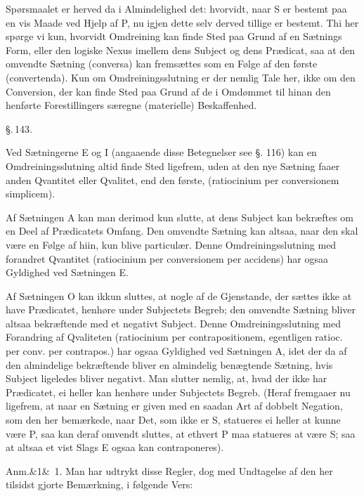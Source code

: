 \documentclass[12pt]{book}
\def\sperr#1{#1}%
\def\textit#1{#1}%
\newcommand{\sperr}[1]{\textls[180]{#1}}
\newcommand{\parag}[1]{%
  \par\vspace{0.9\baselineskip}%
  {\centering\textit{\S.\,#1.}\par}%
  \vspace{0.35\baselineskip}%
  \noindent\hspace{\parindent}\ignorespaces
}
\newcommand{\anm}[1]{%
  \par\vspace{0.5\baselineskip}%
  \noindent\hspace{\parindent}\sperr{Anm.}\ifx&#1&\else~\textit{#1}.\fi
  \enspace\ignorespaces
}
\newcommand{\opage}[1]{\marginnote{\footnotesize\textit{[#1]}}}
\begin{document}
Spørsmaalet er herved da i Almindelighed det: hvorvidt, naar \textit{S} er
bestemt paa en vis Maade ved Hjelp af \textit{P}, nu igjen dette selv derved
tillige er bestemt. Thi her spørge vi kun, hvorvidt Omdreining kan finde Sted
paa Grund af en Sætnings Form, eller den logiske Nexus imellem dens Subject og
dens Prædicat, saa at den omvendte Sætning (\textit{conversa}) kan fremsættes
som en Følge af den første (\textit{convertenda}). Kun om Omdreiningsslutning
er der nemlig Tale her, ikke om den Conversion, der kan finde Sted paa Grund af
de i Omdømmet til hinan%
\opage{332}den henførte Forestillingers særegne (materielle) Beskaffenhed.

\parag{143}

Ved Sætningerne \textit{E} og \textit{I} (angaaende disse Betegnelser see
§. 116) kan en Omdreiningsslutning altid finde Sted ligefrem, uden at den nye
Sætning faaer anden Qvantitet eller Qvalitet, end den første, (\textit{ratiocinium
per conversionem simplicem}).

Af Sætningen \textit{A} kan man derimod kun slutte, at dens Subject kan
bekræftes om en Deel af Prædicatets Omfang. Den omvendte Sætning kan altsaa,
naar den skal være en Følge af hiin, kun blive particulær. Denne
Omdreiningsslutning med forandret Qvantitet (\textit{ratiocinium per
conversionem per accidens}) har ogsaa Gyldighed ved Sætningen \textit{E}.

Af Sætningen \textit{O} kan ikkun sluttes, at nogle af de Gjenstande, der sættes
ikke at have Prædicatet, henhøre under Subjectets Begreb; den omvendte Sætning
bliver altsaa bekræftende med et negativt Subject. Denne Omdreiningsslutning med
Forandring af Qvaliteten (\textit{ratiocinium per contrapositionem, egentligen
ratioc. per conv. per contrapos.}) har ogsaa Gyldighed ved Sætningen \textit{A},
idet der da af den almindelige bekræftende bliver en almindelig benægtende
Sætning, hvis Subject ligeledes bliver negativt. Man slutter nemlig, at, hvad
der ikke har Prædicatet, ei heller kan henhøre under Subjectets Begreb. (Heraf
fremgaaer nu ligefrem,
\opage{333} at naar en Sætning er given med en saadan Art af dobbelt Negation, som den her
bemærkede, naar Det, som ikke er \textit{S}, statueres ei heller at kunne være
\textit{P}, saa kan deraf omvendt sluttes, at ethvert \textit{P} maa statueres
at være \textit{S}; saa at altsaa et vist Slags \textit{E} ogsaa kan
contraponeres).

\anm{1} Man har udtrykt disse Regler, dog med Undtagelse af den her tilsidst
gjorte Bemærkning, i følgende Vers:
\end{document}
